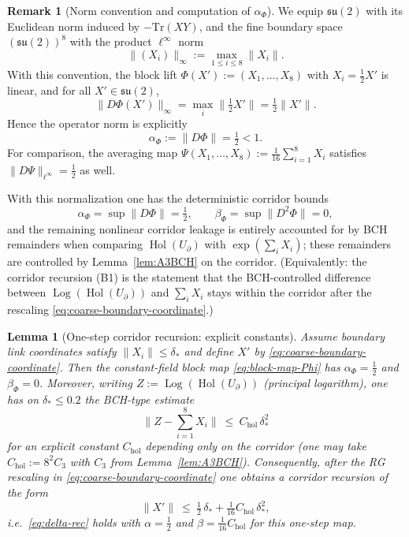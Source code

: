 \documentclass[11pt]{article}
\newtheorem{lemma}[theorem]{Lemma}
\theoremstyle{definition}
\newtheorem{remark}[theorem]{Remark}
\newcommand{\1}{\mathbf{1}}
\begin{document}
\begin{remark}[Norm convention and computation of $\alpha_\Phi$]
We equip $\mathfrak{su}(2)$ with its Euclidean norm induced by $-\mathrm{Tr}(XY)$,
and the fine boundary space $(\mathfrak{su}(2))^8$ with the product $\ell^\infty$ norm
\[
\|(X_i)\|_\infty := \max_{1\le i\le 8}\|X_i\|.
\]
With this convention, the block lift $\Phi(X') := (X_1,\dots,X_8)$ with $X_i=\tfrac12 X'$
is linear, and for all $X'\in\mathfrak{su}(2)$,
\[
\|D\Phi(X')\|_\infty = \max_i \|\tfrac12 X'\| = \tfrac12\|X'\|.
\]
Hence the operator norm is explicitly
\[
\alpha_\Phi := \|D\Phi\| = \tfrac12 < 1.
\]
For comparison, the averaging map $\Psi(X_1,\dots,X_8) := \tfrac1{16}\sum_{i=1}^8 X_i$
satisfies $\|D\Psi\|_{\ell^\infty}=\tfrac12$ as well.
\end{remark}

With this normalization one has the deterministic corridor bounds
\[
\alpha_\Phi=\sup\|D\Phi\|=\tfrac12,\qquad \beta_\Phi=\sup\|D^2\Phi\|=0,
\]
and the remaining nonlinear corridor leakage is entirely accounted for by BCH remainders when comparing
$\operatorname{Hol}(U_{\partial})$ with $\exp(\sum_i X_i)$; these remainders are controlled by Lemma~\ref{lem:A3BCH} on the corridor.
(Equivalently: the corridor recursion (B1) is the statement that the BCH-controlled difference between
$\operatorname{Log}(\operatorname{Hol}(U_{\partial}))$ and $\sum_i X_i$ stays within the corridor after the rescaling \eqref{eq:coarse-boundary-coordinate}.)



\begin{lemma}[One-step corridor recursion: explicit constants]\label{lem:B1-onestep}
Assume boundary link coordinates satisfy $\|X_i\|\le \delta_*$ and define $X'$ by \eqref{eq:coarse-boundary-coordinate}.
Then the constant-field block map \eqref{eq:block-map-Phi} has $\alpha_\Phi=\tfrac12$ and $\beta_\Phi=0$. Moreover,
writing $Z:=\operatorname{Log}(\operatorname{Hol}(U_{\partial}))$ (principal logarithm), one has on $\delta_*\le 0.2$ the BCH-type estimate
\[
\big\|Z-\sum_{i=1}^8 X_i\big\|\ \le\ C_{\mathrm{hol}}\,\delta_*^2
\]
for an explicit constant $C_{\mathrm{hol}}$ depending only on the corridor (one may take $C_{\mathrm{hol}}:=8^2 C_3$ with
$C_3$ from Lemma~\ref{lem:A3BCH}). Consequently, after the RG rescaling in \eqref{eq:coarse-boundary-coordinate} one obtains
a corridor recursion of the form
\[
\|X'\|\ \le\ \tfrac12\,\delta_* + \tfrac{1}{16}C_{\mathrm{hol}}\,\delta_*^2,
\]
i.e.\ \eqref{eq:delta-rec} holds with $\alpha=\tfrac12$ and $\beta=\tfrac{1}{16}C_{\mathrm{hol}}$ for this one-step map.
\end{lemma}
\end{document}
